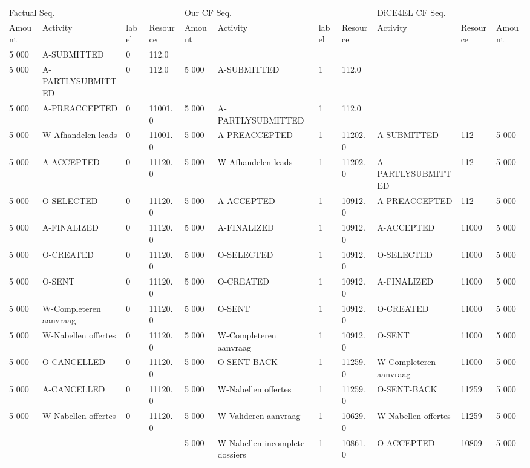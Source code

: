 \begin{tabular}{lllllllllll}
\toprule
\multicolumn{4}{l}{Factual Seq.} & \multicolumn{4}{l}{Our CF Seq.} & \multicolumn{3}{l}{DiCE4EL CF Seq.} \\
Amount & Activity & label & Resource & Amount & Activity & label & Resource & Activity & Resource & Amount \\
\midrule
5 000 & A-SUBMITTED & 0 & 112.0 &  &  &  &  &  &  &  \\
5 000 & A-PARTLYSUBMITTED & 0 & 112.0 & 5 000 & A-SUBMITTED & 1 & 112.0 &  &  &  \\
5 000 & A-PREACCEPTED & 0 & 11001.0 & 5 000 & A-PARTLYSUBMITTED & 1 & 112.0 &  &  &  \\
5 000 & W-Afhandelen leads & 0 & 11001.0 & 5 000 & A-PREACCEPTED & 1 & 11202.0 & A-SUBMITTED & 112 & 5 000 \\
5 000 & A-ACCEPTED & 0 & 11120.0 & 5 000 & W-Afhandelen leads & 1 & 11202.0 & A-PARTLYSUBMITTED & 112 & 5 000 \\
5 000 & O-SELECTED & 0 & 11120.0 & 5 000 & A-ACCEPTED & 1 & 10912.0 & A-PREACCEPTED & 112 & 5 000 \\
5 000 & A-FINALIZED & 0 & 11120.0 & 5 000 & A-FINALIZED & 1 & 10912.0 & A-ACCEPTED & 11000 & 5 000 \\
5 000 & O-CREATED & 0 & 11120.0 & 5 000 & O-SELECTED & 1 & 10912.0 & O-SELECTED & 11000 & 5 000 \\
5 000 & O-SENT & 0 & 11120.0 & 5 000 & O-CREATED & 1 & 10912.0 & A-FINALIZED & 11000 & 5 000 \\
5 000 & W-Completeren aanvraag & 0 & 11120.0 & 5 000 & O-SENT & 1 & 10912.0 & O-CREATED & 11000 & 5 000 \\
5 000 & W-Nabellen offertes & 0 & 11120.0 & 5 000 & W-Completeren aanvraag & 1 & 10912.0 & O-SENT & 11000 & 5 000 \\
5 000 & O-CANCELLED & 0 & 11120.0 & 5 000 & O-SENT-BACK & 1 & 11259.0 & W-Completeren aanvraag & 11000 & 5 000 \\
5 000 & A-CANCELLED & 0 & 11120.0 & 5 000 & W-Nabellen offertes & 1 & 11259.0 & O-SENT-BACK & 11259 & 5 000 \\
5 000 & W-Nabellen offertes & 0 & 11120.0 & 5 000 & W-Valideren aanvraag & 1 & 10629.0 & W-Nabellen offertes & 11259 & 5 000 \\
 &  &  &  & 5 000 & W-Nabellen incomplete dossiers & 1 & 10861.0 & O-ACCEPTED & 10809 & 5 000 \\
\bottomrule
\end{tabular}
